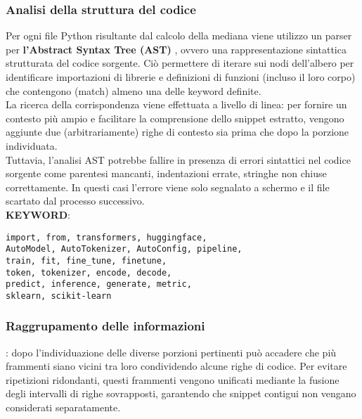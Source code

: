 \documentclass{article}
\begin{document}
\subsubsection{Analisi della struttura del codice}
Per ogni file Python risultante dal calcolo della mediana viene utilizzo un parser per \textbf{l'Abstract Syntax Tree (AST)} \cite{python_ast}, ovvero una rappresentazione sintattica strutturata del codice sorgente. Ciò permettere di iterare sui nodi dell'albero per identificare importazioni di librerie e definizioni di funzioni (incluso il loro corpo) che contengono (match) almeno una delle keyword definite. \\
La ricerca della corrispondenza viene effettuata a livello di linea: per fornire un contesto più ampio e facilitare la comprensione dello snippet estratto, vengono aggiunte due (arbitrariamente) righe di contesto sia prima che dopo la porzione individuata.\\
Tuttavia, l’analisi AST potrebbe fallire in presenza di errori sintattici nel codice sorgente come parentesi mancanti, indentazioni errate, stringhe non chiuse correttamente. In questi casi l'errore viene solo segnalato a schermo e il file scartato dal processo successivo.\\
\textbf{KEYWORD}:
\lstset{basicstyle=\ttfamily, columns=flexible}
\begin{lstlisting}
import, from, transformers, huggingface, 
AutoModel, AutoTokenizer, AutoConfig, pipeline,
train, fit, fine_tune, finetune,
token, tokenizer, encode, decode,
predict, inference, generate, metric,
sklearn, scikit-learn
\end{lstlisting}
    
\subsubsection{Raggrupamento delle informazioni}: dopo l'individuazione delle diverse porzioni pertinenti può accadere che più frammenti siano vicini tra loro condividendo alcune righe di codice. Per evitare ripetizioni ridondanti, questi frammenti vengono unificati mediante la fusione degli intervalli di righe sovrapposti, garantendo che snippet contigui non vengano considerati separatamente. 
\end{document}
